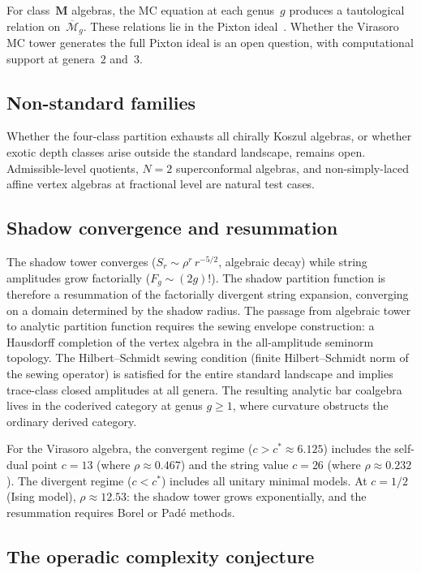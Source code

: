\documentclass[11pt,reqno]{amsart}
\theoremstyle{definition}
\theoremstyle{remark}
\newcommand{\Mbar}{\overline{\mathcal{M}}}
\numberwithin{equation}{section}
\begin{document}
For class~$\mathbf{M}$ algebras, the MC equation at each
genus~$g$ produces a tautological relation on~$\Mbar_g$.
These relations lie in the Pixton
ideal~\cite{JPPZ}. Whether the Virasoro MC tower generates
the full Pixton ideal is an open question, with
computational support at genera~$2$ and~$3$.

\subsection{Non-standard
families}\label{subsec:outlook-nonstandard}

Whether the four-class partition exhausts all chirally
Koszul algebras, or whether exotic depth classes arise
outside the standard landscape, remains open.
Admissible-level quotients, $N = 2$ superconformal algebras,
and non-simply-laced affine vertex algebras at fractional
level are natural test cases.

\subsection{Shadow convergence and
resummation}\label{subsec:outlook-convergence}

The shadow tower converges ($S_r \sim \rho^r\, r^{-5/2}$,
algebraic decay) while string amplitudes grow factorially
($F_g \sim (2g)!$). The shadow partition function is
therefore a resummation of the factorially divergent
string expansion, converging on a domain determined by the
shadow radius. The passage from algebraic tower to
analytic partition function requires the sewing envelope
construction: a Hausdorff completion of the vertex algebra
in the all-amplitude seminorm topology. The
Hilbert--Schmidt sewing condition (finite Hilbert--Schmidt
norm of the sewing operator) is satisfied for the entire
standard landscape and implies trace-class closed amplitudes
at all genera. The resulting analytic bar coalgebra lives in
the coderived category at genus $g \ge 1$, where curvature
obstructs the ordinary derived category.

For the Virasoro algebra, the convergent regime
($c > c^* \approx 6.125$) includes the self-dual point
$c = 13$ (where $\rho \approx 0.467$) and the string value
$c = 26$ (where $\rho \approx 0.232$). The divergent regime
($c < c^*$) includes all unitary minimal models. At
$c = 1/2$ (Ising model), $\rho \approx 12.53$: the shadow
tower grows exponentially, and the resummation requires
Borel or Pad\'e methods.

\subsection{The operadic complexity
conjecture}\label{subsec:outlook-operadic}
\end{document}

